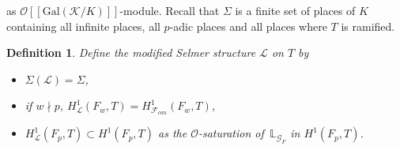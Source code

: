 \documentclass[reqno]{amsart}
\newcounter{dummy} \numberwithin{dummy}{section}
\newtheorem{deft}[dummy]{Definition}
\begin{document}
as $\mathcal{O}[[\mathrm{Gal}(\mathcal{K}/K)]]$-module.
 Recall that $\Sigma$ is a finite set of
places of $K$ containing all infinite places, all $p$-adic places
and all places where $T$ is ramified.
\begin{deft}\label{Definition of modified Selmer}
 Define the modified Selmer
structure $\mathcal{L}$ on $T$ by
\begin{itemize}
    \item $\Sigma(\mathcal{L})=\Sigma$,
    \item if $w\nmid p$,
    $H^{1}_{\mathcal{L}}(F_{w},T)=H^{1}_{\mathcal{F}_{can}}(F_{w},T)$,
    \item   $H^{1}_{\mathcal{L}}(F_{p},T)\subset H^{1}(F_{p},T)$ as the
$\mathcal{O}$-saturation of \,$\mathbb{L}_{\mathcal{G}_{F}}$ in
$H^{1}(F_{p},T)$.
\end{itemize}
\end{deft}
\end{document}

